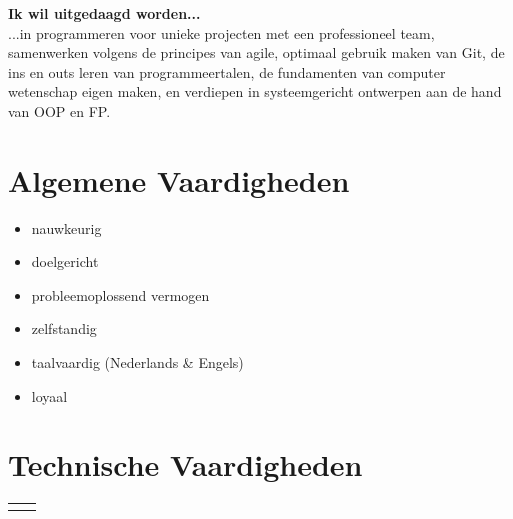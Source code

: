 \documentclass[
	11pt, %
]{FreemanCV}
\begin{document}
\begin{paracol}{2}
	\textbf{Ik wil uitgedaagd worden...}\\
	...in programmeren voor unieke projecten met een professioneel team, samenwerken
	volgens de principes van agile, optimaal gebruik maken van Git, de ins en outs leren
	van programmeertalen, de fundamenten van computer wetenschap eigen maken, en verdiepen
	in systeemgericht ontwerpen aan de hand van OOP en FP.


	\section{Algemene Vaardigheden}
	\begin{itemize}
		\item nauwkeurig
		\item doelgericht
		\item probleemoplossend vermogen
		\item zelfstandig
        \item taalvaardig \small (Nederlands \& Engels) \normalsize
		\item loyaal
	\end{itemize}

	\section{Technische Vaardigheden}

	\begin{supertabular}{r l} %


\end{supertabular}
\end{paracol}
\end{document}
